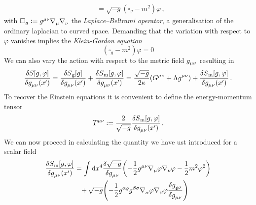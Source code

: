 \begin{example}
\begin{equation}
\begin{split}
&=\sqrt{-g}\left(\square_{g}-m^2\right)\varphi\, ,
\end{split}
\end{equation}
with $\square_{g}:=\tensor{g}{^\mu^\nu}
\tensor{\nabla}{_\mu}\tensor{\nabla}{_\nu} $ the
\emph{Laplace–Beltrami operator}, a generalisation of the ordinary laplacian to
curved space.
Demanding that the variation with respect to $\varphi$ vanishes implies the
\emph{Klein-Gordon equation}
\begin{equation}
\left(\square_g-m^2\right)\varphi=0
\end{equation}
We can also vary the action with respect to the metric
field $\tensor{g}{_\mu_\nu}$ resulting in 
\begin{equation}
\frac{\delta S[g,\varphi]}{\delta
\tensor{g}{_\mu_\nu}\left(x'\right)}=
\frac{\delta S\textsubscript{g}[g]}{\delta
\tensor{g}{_\mu_\nu}\left(x'\right)}
+\frac{\delta S\textsubscript{m}[g,\varphi]}{\delta
\tensor{g}{_\mu_\nu}\left(x'\right)}
=\frac{\sqrt{-g}}{2\kappa}\left(\tensor{G}{^\mu^\nu}+\Lambda\tensor{g}{^\mu^\nu}
\right)+\frac{\delta S\textsubscript{m}[g,\varphi]}{\delta
\tensor{g}{_\mu_\nu}\left(x'\right)}\,.
\end{equation}
To recover the Einstein equations it is convenient to define the
energy-momentum tensor 
\begin{equation}
\tensor{T}{^\mu^\nu}:=\frac{2}{\sqrt{-g}}\frac{\delta
S\textsubscript{m}[g,\varphi]}{\delta \tensor{g}{_\mu_\nu}\left(x'\right)}\,.
\end{equation}
We can now proceed in calculating the quantity we have ust introduced for a
scalar field
\begin{equation}
\begin{split}
\frac{\delta
S\textsubscript{m}[g,\varphi]}{\delta \tensor{g}{_\mu_\nu}\left(x'\right)}
&=\int \dif x^4 \frac{\delta\sqrt{-g}}{\delta
\tensor{g}{_\mu_\nu}}\left(-\frac{1}{2}\tensor{g}{^\mu^\nu}
\tensor{\nabla}{_\mu}\varphi\tensor{\nabla}{_\nu}\varphi-\frac{1}{2}m^2\varphi^2\right)\\
&\phantom{=}+
\sqrt{-g}\left(-\frac{1}{2}\tensor{g}{^\alpha^\varrho}\tensor{g}{^\beta^\sigma} \tensor{\nabla}{_\alpha}\varphi\tensor{\nabla}{_\beta}\varphi\frac{\delta
\tensor{g}{_\varrho_\sigma}}{\delta \tensor{g}{_\mu_\nu}}\right)\\

\end{split}
\end{equation}
\end{example}

